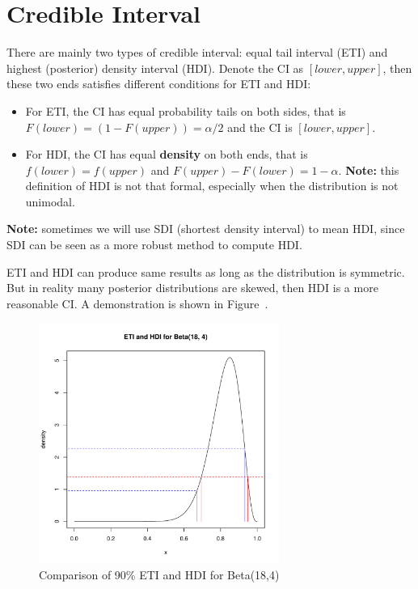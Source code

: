 \documentclass[a4paper,12pt]{article}
\begin{document}
\section{Credible Interval}
\label{sec:credible-interval}

There are mainly two types of credible interval: equal tail interval (ETI) and highest (posterior) density interval (HDI). Denote the CI as $[lower, upper]$, then these two ends satisfies different conditions for ETI and HDI:
\begin{itemize}
\item For ETI, the CI has equal probability tails on both sides, that is $F\left(lower\right) = (1 - F(upper)) = \alpha / 2$ and the CI is $[lower, upper]$.
\item For HDI, the CI has equal \textbf{density} on both ends, that is $f\left(lower\right) = f\left(upper\right)$ and $F\left(upper\right) - F\left(lower\right) = 1 - \alpha$.
  \textbf{Note:} this definition of HDI is not that formal, especially when the distribution is not unimodal.
\end{itemize}
\textbf{Note:} sometimes we will use SDI (shortest density interval) to mean HDI, since SDI can be seen as a more robust method to compute HDI\citep{Liu2015p809-819}.
\par
ETI and HDI can produce same results as long as the distribution is symmetric. But in reality many posterior distributions are skewed, then HDI is a more reasonable CI. A demonstration is shown in Figure~.
\begin{figure}[htbp]
  \centering
  \includegraphics[width = 0.7\textwidth]{figs/eti_and_hdi}
  \caption{Comparison of 90\% ETI and HDI for Beta(18,4)}
  \label{fig:eti_and_hdi}
\end{figure}
\end{document}
